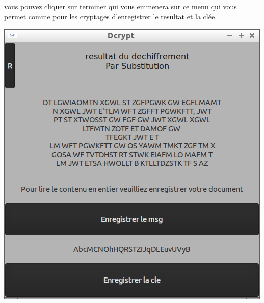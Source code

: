 \documentclass[a4]{article}
\begin{document}
			vous pouvez cliquer sur terminer qui vous emmenera sur ce menu qui vous permet comme pour 
			les cryptages d'enregistrer le resultat et la clée
			\begin{center}\includegraphics[scale=0.4]{12.png}\end{center}
\end{document}
